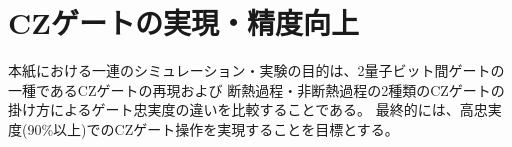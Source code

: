 \section{CZゲートの実現・精度向上}
    本紙における一連のシミュレーション・実験の目的は、2量子ビット間ゲートの一種であるCZゲートの再現および
    断熱過程・非断熱過程の2種類のCZゲートの掛け方によるゲート忠実度の違いを比較することである。
    最終的には、高忠実度(90\%以上)でのCZゲート操作を実現することを目標とする。
